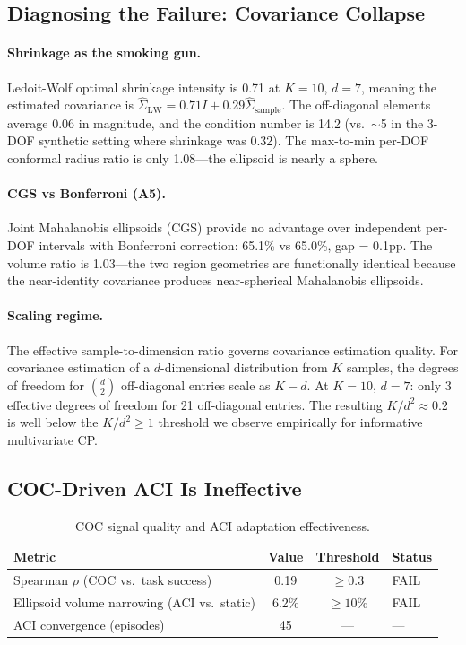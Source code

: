 \documentclass[letterpaper]{article}
\newcommand{\fail}[1]{\textcolor{failred}{#1}}
\begin{document}
\subsection{Diagnosing the Failure: Covariance Collapse}

\paragraph{Shrinkage as the smoking gun.}
Ledoit-Wolf optimal shrinkage intensity is 0.71 at $K{=}10$, $d{=}7$, meaning the estimated covariance is $\hat{\Sigma}_{\text{LW}} = 0.71 I + 0.29 \hat{\Sigma}_{\text{sample}}$.
The off-diagonal elements average 0.06 in magnitude, and the condition number is 14.2 (vs.\ $\sim$5 in the 3-DOF synthetic setting where shrinkage was 0.32).
The max-to-min per-DOF conformal radius ratio is only 1.08---the ellipsoid is nearly a sphere.

\paragraph{CGS vs Bonferroni (A5).}
Joint Mahalanobis ellipsoids (CGS) provide no advantage over independent per-DOF intervals with Bonferroni correction: 65.1\% vs 65.0\%, gap = 0.1pp.
The volume ratio is 1.03---the two region geometries are functionally identical because the near-identity covariance produces near-spherical Mahalanobis ellipsoids.

\paragraph{Scaling regime.}
The effective sample-to-dimension ratio governs covariance estimation quality.
For covariance estimation of a $d$-dimensional distribution from $K$ samples, the degrees of freedom for $\binom{d}{2}$ off-diagonal entries scale as $K - d$.
At $K{=}10$, $d{=}7$: only 3 effective degrees of freedom for 21 off-diagonal entries.
The resulting $K/d^2 \approx 0.2$ is well below the $K/d^2 \geq 1$ threshold we observe empirically for informative multivariate CP.

\subsection{COC-Driven ACI Is Ineffective}

\begin{table}[h]
\centering
\caption{COC signal quality and ACI adaptation effectiveness.}
\label{tab:coc}
\begin{tabular}{lccl}
\toprule
\textbf{Metric} & \textbf{Value} & \textbf{Threshold} & \textbf{Status} \\
\midrule
Spearman $\rho$ (COC vs.\ task success) & 0.19 & $\geq 0.3$ & \fail{FAIL} \\
Ellipsoid volume narrowing (ACI vs.\ static) & 6.2\% & $\geq 10\%$ & \fail{FAIL} \\
ACI convergence (episodes) & 45 & --- & --- \\
\bottomrule
\end{tabular}
\end{table}
\end{document}
